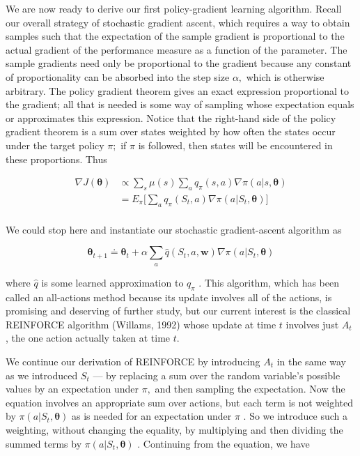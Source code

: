 \documentclass{article}
\begin{document}
We are now ready to derive our first policy-gradient learning algorithm. Recall our overall strategy of stochastic gradient ascent, which requires a way to obtain samples such that the expectation of the sample gradient is proportional to the actual gradient of the performance measure as a function of the parameter. The sample gradients 
need only be proportional to the gradient because any constant of proportionality can be absorbed into the step size $\alpha ,$ which is otherwise arbitrary. The policy gradient theorem gives an exact expression proportional to the gradient; all that is needed is some way of sampling whose expectation equals or approximates this expression. 
Notice that the right-hand side of the policy gradient theorem is a sum over states weighted by how often the states occur under the target policy $\pi ;$ if $\pi$ is followed, then states will be encountered in these proportions. Thus

$$
\begin{aligned} { \nabla J ( \pmb { \theta } ) } & { { } \propto \sum _ { s } \mu ( s ) \sum _ { a } q _ { \pi } ( s , a ) \nabla \pi ( a | s , \pmb { \theta } ) } \\ { } & { { } = E _ { \pi } \Biggl [ \sum _ { a } q _ { \pi } ( S _ { t } , a ) \nabla \pi ( a | S _ { t } , \pmb { \theta } ) \Biggr ] } \\ \end{aligned}
$$

We could stop here and instantiate our stochastic gradient-ascent algorithm as

$$
\pmb { \theta } _ { t + 1 } \doteq \pmb { \theta } _ { t } + \alpha \sum _ { a } \hat { q } ( S _ { t } , a , \mathbf { w } ) \nabla \pi ( a | S _ { t } , \pmb { \theta } )
$$

where $\hat { q }$ is some learned approximation to $q _ { \pi }$ . This algorithm, which has been called an all-actions method because its update involves all of the actions, is promising and deserving of further study, but our current interest is the classical REINFORCE algorithm (Willams, 1992) whose update at time $t$ involves just $A _ { t }$ , 
the one action actually taken at time $t$.

We continue our derivation of REINFORCE by introducing $A _ { t }$ in the same way as we introduced $S _ { t }$ — by replacing a sum over the random variable's possible values by an expectation under $\pi ,$ and then sampling the expectation. Now the equation involves an appropriate sum over actions, but each term is not weighted by $\pi ( a | S _ { t } , \pmb { \theta } )$ 
as is needed for an expectation under $\pi$ . So we introduce such a weighting, without changing the equality, by multiplying and then dividing the summed terms by $\pi ( a | S _ { t } , \pmb { \theta } )$ . Continuing from the equation, we have
\end{document}
